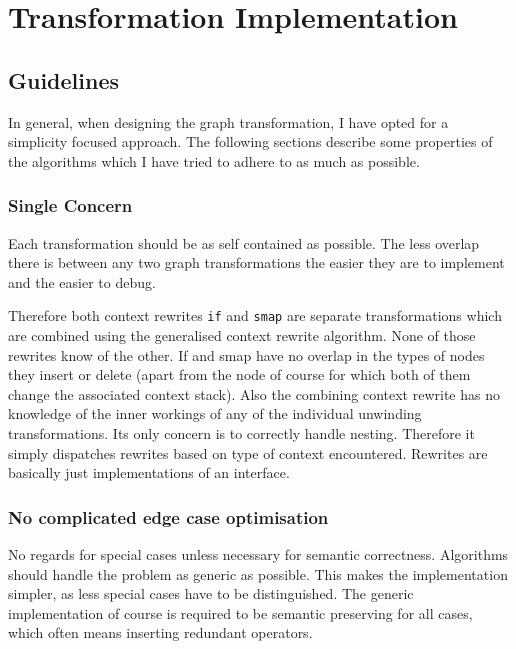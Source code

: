 \chapter{Transformation Implementation}
\label{ch:trans-implementation}

\section{Guidelines}

In general, when designing the \yauhau{} graph transformation, I have opted for a simplicity focused approach.
The following sections describe some properties of the algorithms which I have tried to adhere to as much as possible.

\subsection{Single Concern}

Each transformation should be as self contained as possible.
The less overlap there is between any two graph transformations the easier they are to implement and the easier to debug.

Therefore both context rewrites \texttt{if} and \texttt{smap} are separate transformations which are combined using the generalised context rewrite algorithm.
None of those rewrites know of the other.
If and smap have no overlap in the types of nodes they insert or delete (apart from the \fetch{} node of course for which both of them change the associated context stack).
Also the combining context rewrite has no knowledge of the inner workings of any of the individual unwinding transformations.
Its only concern is to correctly handle nesting.
Therefore it simply dispatches rewrites based on type of context encountered.
Rewrites are basically just implementations of an interface.

\subsection{No complicated edge case optimisation}

No regards for special cases unless necessary for semantic correctness.
Algorithms should handle the problem as generic as possible.
This makes the implementation simpler, as less special cases have to be distinguished.
The generic implementation of course is required to be semantic preserving for all cases, which often means inserting redundant operators.

